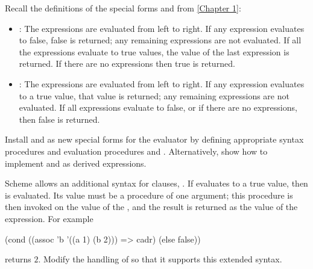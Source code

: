 \begin{exercise}
	\label{Exercise 4.4}
	Recall the definitions of the
	special forms  and  from \cref{Chapter 1}:
	\begin{itemize}

		\item
			:
			The expressions are evaluated from left to right.
			If any expression evaluates to false, false is returned;
			any remaining expressions are not evaluated.
			If all the expressions evaluate to true values, the value of the last expression is returned.
			If there are no expressions then true is returned.


		\item
			:
			The expressions are evaluated from left to right.
			If any expression evaluates to a true value, that value is returned;
			any remaining expressions are not evaluated.
			If all expressions evaluate to false, or if there are no expressions, then false is returned.

	\end{itemize}

	Install  and  as new special forms for the evaluator by defining appropriate syntax procedures and evaluation procedures  and .
	Alternatively, show how to implement  and  as derived expressions.
\end{exercise}



\begin{exercise}
	\label{Exercise 4.5}
	Scheme allows an additional syntax for  clauses, .
	If  evaluates to a true value, then  is evaluated.
	Its value must be a procedure of one argument;
	this procedure is then invoked on the value of the , and the result is returned as the value of the  expression.
	For example
	\begin{scheme}
	  (cond ((assoc 'b '((a 1) (b 2))) => cadr)
	        (else false))
	\end{scheme}
	returns \( 2 \).
	Modify the handling of  so that it supports this extended syntax.
\end{exercise}



